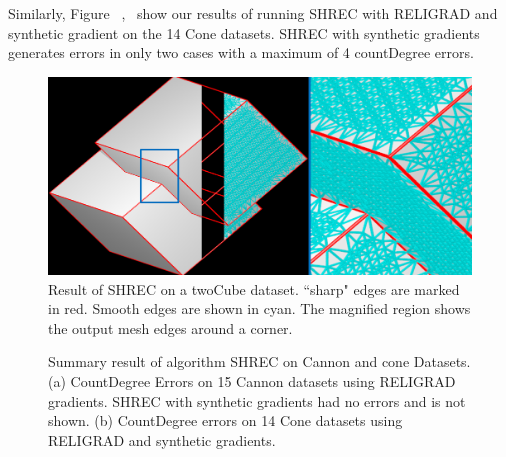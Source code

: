 Similarly, Figure ~\protect{},~\protect{} show our results of running SHREC with RELIGRAD and synthetic gradient on the 14 Cone datasets.
SHREC with synthetic gradients generates errors in only two cases with a  maximum of 4 countDegree errors. 
\begin{figure}[tb]
	\includegraphics[width=\linewidth]{images/shrecPerfect.eps}
	\caption{Result of SHREC on a twoCube dataset. ``sharp" edges are marked in red. Smooth edges are shown in cyan. The magnified region shows the output mesh edges around a corner.}
	\label{fig:shrecPerfect1}
\end{figure}
\begin{figure}[htb]
	\caption{Summary result of algorithm SHREC on Cannon and cone Datasets. (a) CountDegree Errors on 15 Cannon datasets using RELIGRAD gradients. SHREC with synthetic gradients had no errors and is not shown. (b) CountDegree errors on 14 Cone datasets using RELIGRAD and synthetic gradients.}
	\label{fig:cannon_cone_summary}
\end{figure}
